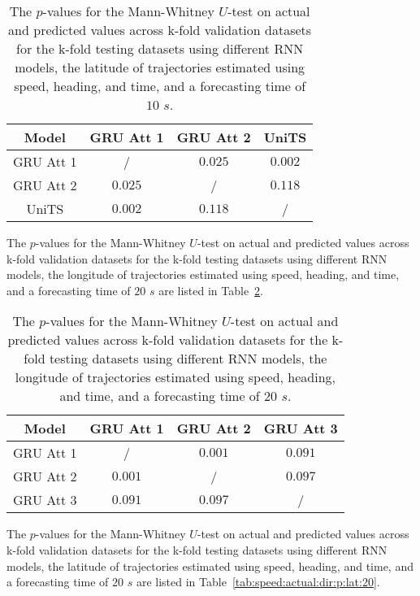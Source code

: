 \begin{table}[!ht]
	\centering
	\begin{tabular}{|c|c|c|c|}
		\hline
		Model & GRU Att 1 & GRU Att 2 & UniTS \\ \hline
		GRU Att 1 & / & $\mathbf{0.025}$ & $\mathbf{0.002}$ \\ \hline
		GRU Att 2 & $\mathbf{0.025}$ & / & $\mathbf{0.118}$ \\ \hline
		UniTS & $\mathbf{0.002}$ & $\mathbf{0.118}$ & / \\ \hline
	\end{tabular}
	\caption{The $p$-values for the Mann-Whitney $U$-test on actual and predicted values across k-fold validation datasets for the k-fold testing datasets using different RNN models, the latitude of trajectories estimated using speed, heading, and time, and a forecasting time of $10$ $s$.}
	\label{tab:speed:actual:dir:p:lat:10}
\end{table}

The $p$-values for the Mann-Whitney $U$-test on actual and predicted values across k-fold validation datasets for the k-fold testing datasets using different RNN models, the longitude of trajectories estimated using speed, heading, and time, and a forecasting time of $20$ $s$ are listed in Table~\ref{tab:speed:actual:dir:p:long:20}.

\begin{table}[!ht]
	\centering
	\begin{tabular}{|c|c|c|c|}
		\hline
		Model & GRU Att 1 & GRU Att 2 & GRU Att 3 \\ \hline
		GRU Att 1 & / & $\mathbf{0.001}$ & $\mathbf{0.091}$ \\ \hline
		GRU Att 2 & $\mathbf{0.001}$ & / & $\mathbf{0.097}$ \\ \hline
		GRU Att 3 & $\mathbf{0.091}$ & $\mathbf{0.097}$ & / \\ \hline
	\end{tabular}
	\caption{The $p$-values for the Mann-Whitney $U$-test on actual and predicted values across k-fold validation datasets for the k-fold testing datasets using different RNN models, the longitude of trajectories estimated using speed, heading, and time, and a forecasting time of $20$ $s$.}
	\label{tab:speed:actual:dir:p:long:20}
\end{table}

The $p$-values for the Mann-Whitney $U$-test on actual and predicted values across k-fold validation datasets for the k-fold testing datasets using different RNN models, the latitude of trajectories estimated using speed, heading, and time, and a forecasting time of $20$ $s$ are listed in Table~\ref{tab:speed:actual:dir:p:lat:20}.

